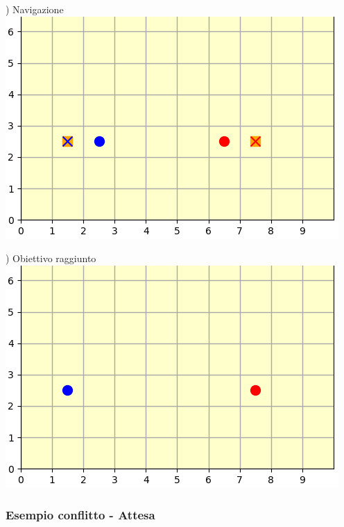 \documentclass[12pt]{article}
\begin{document}
\noindent\begin{minipage}[ht]{0.45\linewidth}
) Navigazione
\includegraphics[width=\textwidth]{SimulazioniNavigazione/2AGV_ConflittoStandard/4.png}
\end{minipage}
\begin{minipage}[ht]{0.45\linewidth}
) Obiettivo raggiunto
\includegraphics[width=\textwidth]{SimulazioniNavigazione/2AGV_ConflittoStandard/5.png}
\end{minipage}

\newpage

\subsubsection{Esempio conflitto - Attesa}
\vspace{0.2cm}
\end{document}
